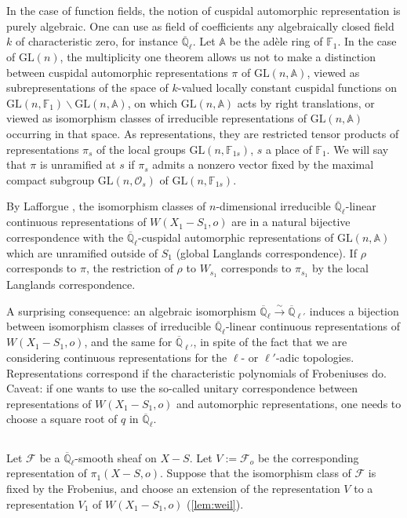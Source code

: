 \documentclass[11pt,a4paper]{article}
\theoremstyle{plain}
\theoremstyle{definition}
\newcommand{\Ql}{\overline{\mathbb{Q}}_\ell}
\newcommand{\Qlb}{\overline{\mathbb{Q}}_{\ell'}}
\newcommand{\GL}{\mathrm{GL}}
\begin{document}
In the case of function fields, the notion of cuspidal automorphic representation is purely algebraic. One can use as field of coefficients any algebraically closed field $k$ of characteristic zero, for instance $\Ql$. Let $\mathbb{A}$ be the ad\`ele ring of $\mathbb{F}_1$. In the case of $\GL(n)$, the multiplicity one theorem allows us not to make a distinction between cuspidal automorphic representations $\pi$ of $\GL(n, \mathbb{A})$, viewed as subrepresentations of the space of $k$-valued locally constant cuspidal functions on $\GL(n, \mathbb{F}_1) \backslash \GL(n, \mathbb{A})$, on which $\GL(n, \mathbb{A})$ acts by right translations, or viewed as isomorphism classes of irreducible representations of $\GL(n, \mathbb{A})$ occurring in that space. As representations, they are restricted tensor products of representations $\pi_s$ of the local groups $\GL(n, \mathbb{F}_{1s})$, $s$ a place of $\mathbb{F}_1$. We will say that $\pi$ is unramified at $s$ if $\pi_s$ admits a nonzero vector fixed by the maximal compact subgroup $\GL(n, \mathcal{O}_s)$ of $\GL(n, \mathbb{F}_{1s})$.

By Lafforgue \cite{L}, the isomorphism classes of $n$-dimensional irreducible $\Ql$-linear continuous representations of $W(X_1 - S_1, o)$ are in a natural bijective correspondence with the $\Ql$-cuspidal automorphic representations of $\GL(n, \mathbb{A})$ which are unramified outside of $S_1$ (global Langlands correspondence). If $\rho$ corresponds to $\pi$, the restriction of $\rho$ to $W_{s_1}$ corresponds to $\pi_{s_1}$ by the local Langlands correspondence.

A surprising consequence: an algebraic isomorphism $\Ql \xrightarrow{\sim} \Qlb$ induces a bijection between isomorphism classes of irreducible $\Ql$-linear continuous representations of $W(X_1 - S_1, o)$, and the same for $\Qlb$, in spite of the fact that we are considering continuous representations for the $\ell$- or $\ell'$-adic topologies. Representations correspond if the characteristic polynomials of Frobeniuses do. Caveat: if one wants to use the so-called unitary correspondence between representations of $W(X_1 - S_1, o)$ and automorphic representations, one needs to choose a square root of $q$ in $\Ql$.

\subsection{}

Let $\mathcal{F}$ be a $\Ql$-smooth sheaf on $X - S$. Let $V := \mathcal{F}_o$ be the corresponding representation of $\pi_1(X - S, o)$. Suppose that the isomorphism class of $\mathcal{F}$ is fixed by the Frobenius, and choose an extension of the representation $V$ to a representation $V_1$ of $W(X_1 - S_1, o)$ (\ref{lem:weil}).
\end{document}

